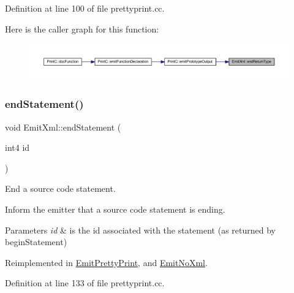 Definition at line 100 of file prettyprint.\+cc.

Here is the caller graph for this function\+:
\nopagebreak
\begin{figure}[H]
\begin{center}
\leavevmode
\includegraphics[width=350pt]{class_emit_xml_af7f778b3b2111e793d6ffd73017209f9_icgraph}
\end{center}
\end{figure}
\mbox{\label{class_emit_xml_a179b45bd8929a464f8fbc622de96f399}} 
\subsubsection{\texorpdfstring{endStatement()}{endStatement()}}
{\footnotesize\ttfamily void Emit\+Xml\+::end\+Statement (\begin{DoxyParamCaption}\item[{int4}]{id }\end{DoxyParamCaption})\hspace{0.3cm}{\ttfamily [virtual]}}



End a source code statement. 

Inform the emitter that a source code statement is ending. 
\begin{DoxyParams}{Parameters}
{\em id} & is the id associated with the statement (as returned by begin\+Statement) \\
\hline
\end{DoxyParams}


Reimplemented in \mbox{\hyperlink{class_emit_pretty_print_ab19e4ce2f8b1028e41d217d6c762ef7a}{Emit\+Pretty\+Print}}, and \mbox{\hyperlink{class_emit_no_xml_a8b7a4a5484ac357c962cb427c760def6}{Emit\+No\+Xml}}.



Definition at line 133 of file prettyprint.\+cc.

